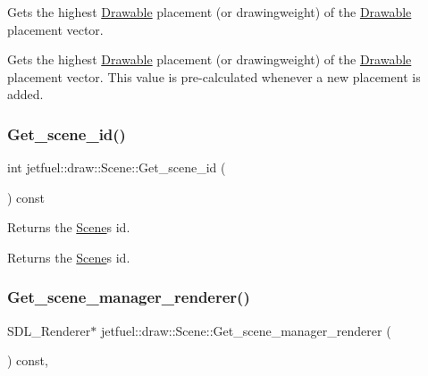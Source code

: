 Gets the highest \hyperlink{classjetfuel_1_1draw_1_1Drawable}{Drawable} placement (or drawingweight) of the \hyperlink{classjetfuel_1_1draw_1_1Drawable}{Drawable} placement vector. 

Gets the highest \hyperlink{classjetfuel_1_1draw_1_1Drawable}{Drawable} placement (or drawingweight) of the \hyperlink{classjetfuel_1_1draw_1_1Drawable}{Drawable} placement vector. This value is pre-\/calculated whenever a new placement is added. \mbox{\label{classjetfuel_1_1draw_1_1Scene_a03433414bcb71d2001ecc717800b628b}} 
\subsubsection{\texorpdfstring{Get\+\_\+scene\+\_\+id()}{Get\_scene\_id()}}
{\footnotesize\ttfamily int jetfuel\+::draw\+::\+Scene\+::\+Get\+\_\+scene\+\_\+id (\begin{DoxyParamCaption}{ }\end{DoxyParamCaption}) const\hspace{0.3cm}{\ttfamily [inline]}}



Returns the \hyperlink{classjetfuel_1_1draw_1_1Scene}{Scene}\textquotesingle{}s id. 

Returns the \hyperlink{classjetfuel_1_1draw_1_1Scene}{Scene}\textquotesingle{}s id. \mbox{\label{classjetfuel_1_1draw_1_1Scene_abb0c1a20e3bb87167c75ada894acd60b}} 
\subsubsection{\texorpdfstring{Get\+\_\+scene\+\_\+manager\+\_\+renderer()}{Get\_scene\_manager\_renderer()}}
{\footnotesize\ttfamily S\+D\+L\+\_\+\+Renderer$\ast$ jetfuel\+::draw\+::\+Scene\+::\+Get\+\_\+scene\+\_\+manager\+\_\+renderer (\begin{DoxyParamCaption}{ }\end{DoxyParamCaption}) const\hspace{0.3cm}{\ttfamily [inline]}, {\ttfamily [protected]}}



